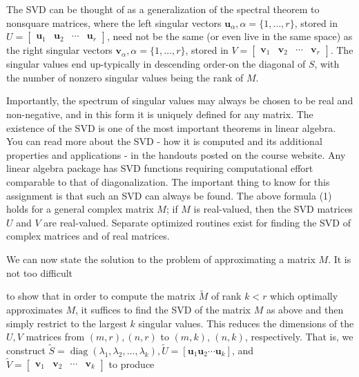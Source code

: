 \documentclass[12pt]{article}
\begin{document}
The SVD can be thought of as a generalization of the spectral theorem to nonsquare matrices, where the left singular vectors $\boldsymbol{u}_{\alpha}, \alpha=\{1, \ldots, r\}$, stored in $U=\left[\begin{array}{llll}\boldsymbol{u}_{1} & \boldsymbol{u}_{2} & \cdots & \boldsymbol{u}_{r}\end{array}\right]$, need not be the same (or even live in the same space) as the right singular vectors $\boldsymbol{v}_{\alpha}, \alpha=\{1, \ldots, r\}$, stored in $V=\left[\begin{array}{llll}\boldsymbol{v}_{1} & \boldsymbol{v}_{2} & \cdots & \boldsymbol{v}_{r}\end{array}\right]$. The singular values end up-typically in descending order-on the diagonal of $S$, with the number of nonzero singular values being the rank of $M$.

Importantly, the spectrum of singular values may always be chosen to be real and non-negative, and in this form it is uniquely defined for any matrix. The existence of the SVD is one of the most important theorems in linear algebra. You can read more about the SVD - how it is computed and its additional properties and applications - in the handouts posted on the course website. Any linear algebra package has SVD functions requiring computational effort comparable to that of diagonalization. The important thing to know for this assignment is that such an SVD can always be found. The above formula (1) holds for a general complex matrix $M$; if $M$ is real-valued, then the SVD matrices $U$ and $V$ are real-valued. Separate optimized routines exist for finding the SVD of complex matrices and of real matrices.

We can now state the solution to the problem of approximating a matrix $M$. It is not too difficult

to show that in order to compute the matrix $\tilde{M}$ of rank $k<r$ which optimally approximates $M$, it suffices to find the SVD of the matrix $M$ as above and then simply restrict to the largest $k$ singular values. This reduces the dimensions of the $U, V$ matrices from $(m, r),(n, r)$ to $(m, k)$, $(n, k)$, respectively. That is, we construct $\tilde{S}=\operatorname{diag}\left(\lambda_{1}, \lambda_{2}, \ldots, \lambda_{k}\right), \tilde{U}=\left[\boldsymbol{u}_{1} \boldsymbol{u}_{2} \cdots \boldsymbol{u}_{k}\right]$, and $\tilde{V}=\left[\begin{array}{llll}\boldsymbol{v}_{1} & \boldsymbol{v}_{2} & \cdots & \boldsymbol{v}_{k}\end{array}\right]$ to produce
\end{document}
